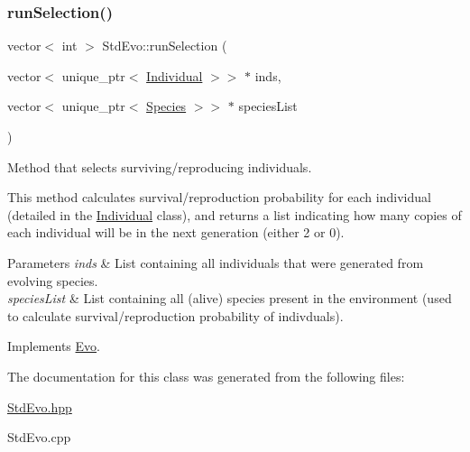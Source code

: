 \subsubsection{\texorpdfstring{run\+Selection()}{runSelection()}}
{\footnotesize\ttfamily vector$<$ int $>$ Std\+Evo\+::run\+Selection (\begin{DoxyParamCaption}\item[{vector$<$ unique\+\_\+ptr$<$ \hyperlink{classIndividual}{Individual} $>$$>$ $\ast$}]{inds,  }\item[{vector$<$ unique\+\_\+ptr$<$ \hyperlink{classSpecies}{Species} $>$$>$ $\ast$}]{species\+List }\end{DoxyParamCaption})\hspace{0.3cm}{\ttfamily [virtual]}}



Method that selects surviving/reproducing individuals. 

This method calculates survival/reproduction probability for each individual (detailed in the \hyperlink{classIndividual}{Individual} class), and returns a list indicating how many copies of each individual will be in the next generation (either 2 or 0).


\begin{DoxyParams}{Parameters}
{\em inds} & List containing all individuals that were generated from evolving species. \\
\hline
{\em species\+List} & List containing all (alive) species present in the environment (used to calculate survival/reproduction probability of indivduals). \\
\hline
\end{DoxyParams}


Implements \hyperlink{classEvo_a10ff4eefe3967ff5cf5f820890c18079}{Evo}.



The documentation for this class was generated from the following files\+:\begin{DoxyCompactItemize}
\item 
\hyperlink{StdEvo_8hpp}{Std\+Evo.\+hpp}\item 
Std\+Evo.\+cpp\end{DoxyCompactItemize}
